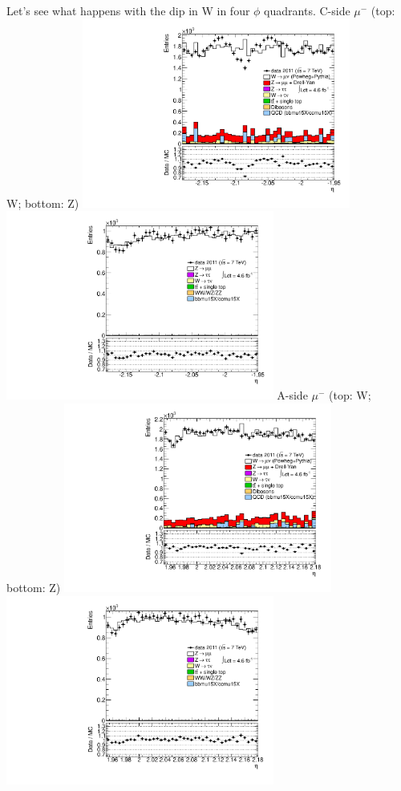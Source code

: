  {
Let's see what happens with the dip in W in four $\phi$ quadrants.
}
 {
\colb[T]
C-side $\mu^{-}$ (top: W; bottom: Z)
\centering
\includegraphics[width=0.66\textwidth]{dates/20130306/figures/etaphi/WlQ1_10_C_stack_l_eta_NEG} \\
\includegraphics[width=0.66\textwidth]{dates/20130306/figures/etaphi/Z_10_C_stack_lN_eta_ALL.pdf}
A-side $\mu^{-}$ (top: W; bottom: Z)
\centering
\includegraphics[width=0.66\textwidth]{dates/20130306/figures/etaphi/WlQ1_10_A_stack_l_eta_NEG} \\
\includegraphics[width=0.66\textwidth]{dates/20130306/figures/etaphi/Z_10_A_stack_lN_eta_ALL.pdf} 
\cole
} %
